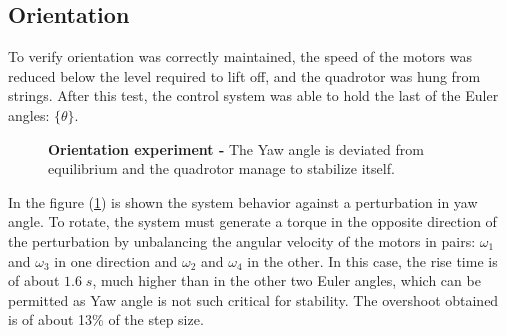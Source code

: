 \documentclass[conference]{IEEEtran}
\newcommand{\refp}[1]{(\ref{#1})}
\begin{document}
\subsection{Orientation}
To verify orientation was correctly maintained, the speed of the motors was reduced below the level required to lift off, and the quadrotor was hung from strings. After this test, the control system was able to hold the last of the Euler angles: $\{\theta\}$. 
\begin{figure}[h!]
  \centering
   \hspace*{-5pt}
  \caption{\textbf{Orientation experiment -} The Yaw angle is deviated from equilibrium and the quadrotor manage to stabilize itself.}
  \label{fig:theta_all}
\end{figure}
In the figure \refp{fig:theta_all} is shown the system behavior against a perturbation in yaw angle. To rotate, the system must generate a torque in the opposite direction of the perturbation by unbalancing the angular velocity of the motors in pairs: $\omega_1$ and $\omega_3$ in one direction and $\omega_2$ and $\omega_4$ in the other. In this case, the rise time is of about $1.6\;s$, much higher than in the other two Euler angles, which can be permitted as Yaw angle is not such critical for stability. The overshoot obtained is of about 13\% of the step size.
\end{document}
